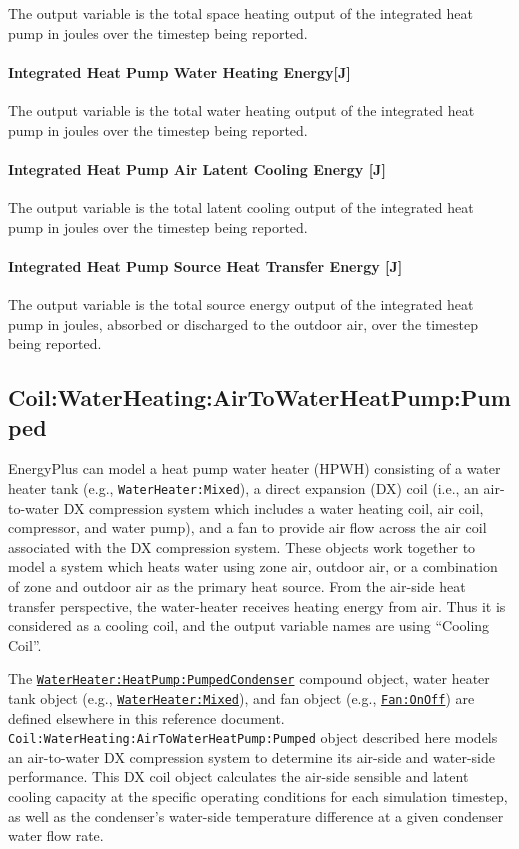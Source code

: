 The output variable is the total space heating output of the integrated heat pump in joules over the timestep being reported.

\paragraph{Integrated Heat Pump Water Heating Energy{[}J{]}}\label{Out-Total-WH-Energy-ASIHP}
The output variable is the total water heating output of the integrated heat pump in joules over the timestep being reported.


\paragraph{Integrated Heat Pump Air Latent Cooling Energy {[}J{]}}\label{Out-Total-LatCooling-Energy-ASIHP}
The output variable is the total latent cooling output of the integrated heat pump in joules over the timestep being reported.

\paragraph{Integrated Heat Pump Source Heat Transfer Energy {[}J{]}}\label{Out-Total-Source-Energy-ASIHP}
The output variable is the total source energy output of the integrated heat pump in joules, absorbed or discharged to the outdoor air, over the timestep being reported.

\subsection{Coil:WaterHeating:AirToWaterHeatPump:Pumped}\label{coilwaterheatingairtowaterheatpumppumped}

EnergyPlus can model a heat pump water heater (HPWH) consisting of a water heater tank (e.g., \lstinline!WaterHeater:Mixed!), a direct expansion (DX) coil (i.e., an air-to-water DX compression system which includes a water heating coil, air coil, compressor, and water pump), and a fan to provide air flow across the air coil associated with the DX compression system. These objects work together to model a system which heats water using zone air, outdoor air, or a combination of zone and outdoor air as the primary heat source. From the air-side heat transfer perspective, the water-heater receives heating energy from air. Thus it is considered as a cooling coil, and the output variable names are using ``Cooling Coil''.

The \hyperref[waterheaterheatpumppumpedcondenser]{\lstinline!WaterHeater:HeatPump:PumpedCondenser!} compound object, water heater tank object (e.g., \hyperref[waterheatermixed]{\lstinline!WaterHeater:Mixed!}), and fan object (e.g., \hyperref[fanonoff]{\lstinline!Fan:OnOff!}) are defined elsewhere in this reference document. \lstinline!Coil:WaterHeating:AirToWaterHeatPump:Pumped! object described here models an air-to-water DX compression system to determine its air-side and water-side performance. This DX coil object calculates the air-side sensible and latent cooling capacity at the specific operating conditions for each simulation timestep, as well as the condenser's water-side temperature difference at a given condenser water flow rate.


